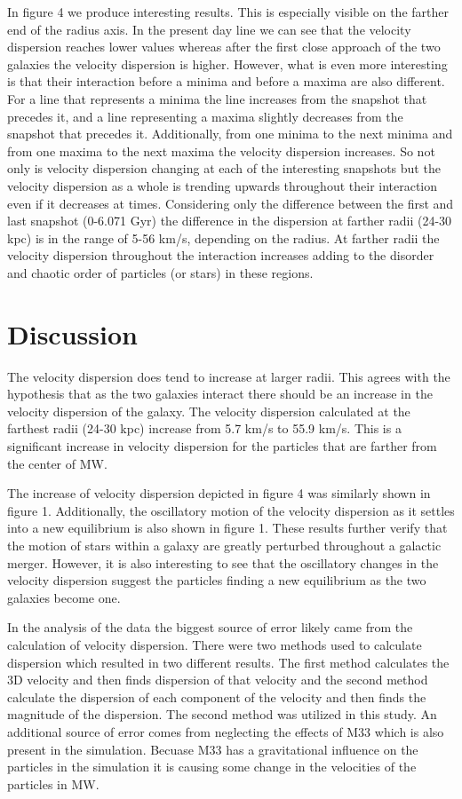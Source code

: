 \documentclass[fleqn,usenatbib]{mnras}
\begin{document}
In figure 4 we produce interesting results. This is especially visible on the farther end of the radius axis. In the present day line we can see that the velocity dispersion reaches lower values whereas after the first close approach of the two galaxies the velocity dispersion is higher. However, what is even more interesting is that their interaction before a minima and before a maxima are also different. For a line that represents a minima the line increases from the snapshot that precedes it, and a line representing a maxima slightly decreases from the snapshot that precedes it. Additionally, from one minima to the next minima and from one maxima to the next maxima the velocity dispersion increases. So not only is velocity dispersion changing at each of the interesting snapshots but the velocity dispersion as a whole is trending upwards throughout their interaction even if it decreases at times. Considering only the difference between the first and last snapshot (0-6.071 Gyr) the difference in the dispersion at farther radii (24-30 kpc) is in the range of 5-56 km/s, depending on the radius. At farther radii the velocity dispersion throughout the interaction increases adding to the disorder and chaotic order of particles (or stars) in these regions.

\section{Discussion}

The velocity dispersion does tend to increase at larger radii. This agrees with the hypothesis that as the two galaxies interact there should be an increase in the velocity dispersion of the galaxy. The velocity dispersion calculated at the farthest radii (24-30 kpc) increase from 5.7 km/s to 55.9 km/s. This is a significant increase in velocity dispersion for the particles that are farther from the center of MW.

The increase of velocity dispersion depicted in figure 4 was similarly shown in figure 1. \cite{Stickley_2012} Additionally, the oscillatory motion of the velocity dispersion as it settles into a new equilibrium is also shown in figure 1. \cite{Stickley_2012} These results further verify that the motion of stars within a galaxy are greatly perturbed throughout a galactic merger. However, it is also interesting to see that the oscillatory changes in the velocity dispersion suggest the particles finding a new equilibrium as the two galaxies become one.

In the analysis of the data the biggest source of error likely came from the calculation of velocity dispersion. There were two methods used to calculate dispersion which resulted in two different results. The first method calculates the 3D velocity and then finds dispersion of that velocity and the second method calculate the dispersion of each component of the velocity and then finds the magnitude of the dispersion. The second method was utilized in this study. An additional source of error comes from neglecting the effects of M33 which is also present in the simulation. Becuase M33 has a gravitational influence on the particles in the simulation it is causing some change in the velocities of the particles in MW.
\end{document}
